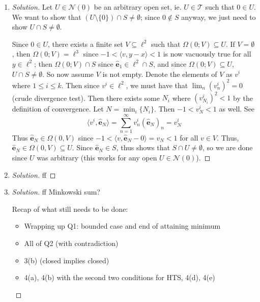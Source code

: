 \documentclass{article}
\begin{document}
\begin{enumerate}
\begin{proof}[Solution]
		This satisfies all the conditions for a HTS,
		thus $(\ell^2,\mathcal{T})$ is a HTS.
	\end{proof}
	\item \begin{proof}[Solution]\let\qed\relax
			Let $U \in \mathcal{N}(0)$ be an arbitrary open set,
			ie. $U \in \mathcal{T}$ such that $0 \in U$.
			We want to show that $(U\setminus\{0\})\cap S \neq \emptyset$;
			since $0 \not\in S$ anyway, we just need to show
			$U \cap S \neq \emptyset$.

			Since $0 \in U$, there exists a finite set $V\subseteq \ell^2$
			such that $\Omega(0;V) \subseteq U$.
			If $V = \emptyset$, then $\Omega(0;V) = \ell^3$
			since $-1 < \langle v, y-x \rangle < 1$ is now
			vacuously true for all $y \in \ell^2$;
			then $\Omega(0;V) \cap S$ since $\hat{\mathbf{e}}_1 \in \ell^2 \cap S$,
			and since $\Omega(0;V) \subseteq U$, $U \cap S \neq \emptyset$.
			So now assume $V$ is not empty.
			Denote the elements of $V$ as $v^{i}$ where $1 \leq i \leq k$.
			Then since $v^i \in \ell^2$,
			we must have that $\lim_n (v^i_n)^2 = 0$ (crude divergence test).
			Then there exists some $N_i$ where $(v^i_{N_i})^2 < 1$ by the definition of convergence.
			Let $N = \min_i\{N_i\}$.
			Then $-1 < v^i_N < 1$ as well.
			See
			\[
				\langle v^i, \hat{\mathbf{e}}_N \rangle =
				\sum_{n=1}^\infty v^i_n (\hat{\mathbf{e}}_N)_n
				= v^i_N
			\]
			Thus $\hat{\mathbf{e}}_N \in \Omega(0,V)$ since
			$-1 < \langle v, \hat{\mathbf{e}}_N - 0 \rangle = v_N < 1$
			for all $v \in V$.
			Thus, $\hat{\mathbf{e}}_N \in \Omega(0,V) \subseteq U$.
			Since $\hat{\mathbf{e}}_N \in S$,
			thus shows that $S \cap U \neq \emptyset$,
			so we are done since $U$ was arbitrary
			(this works for any open $U \in \mathcal{N}(0)$).
	\end{proof}
	\item \begin{proof}[Solution]\let\qed\relax
		ff
	\end{proof}
	\item \begin{proof}[Solution]\let\qed\relax
		ff Minkowski sum?

		Recap of what still needs to be done:
		\begin{itemize}
			\item Wrapping up Q1: bounded case and end of attaining minimum
			\item All of Q2 (with contradiction)
			\item 3(b) (closed implies closed)
			\item 4(a), 4(b) with the second two conditions for HTS,
				4(d), 4(e)
		\end{itemize}
	\end{proof}
\end{enumerate}
\clearpage
\end{document}
